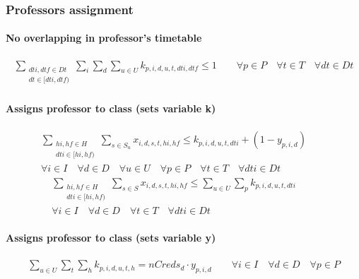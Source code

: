 \subsubsection{Professors assignment}

\paragraph{No overlapping in professor's timetable}
\begin{eqnarray}
\sum_{ \substack {dti,dtf \in Dt \\ dt \in [dti,dtf)} } \sum\limits_{i} \sum\limits_{d} \sum\limits_{u \in U} k_{p,i,d,u,t,dti,dtf} \le 1 \nonumber \qquad
\forall p \in P \quad
\forall t \in T \quad
\forall dt \in Dt
\end{eqnarray}

\paragraph{Assigns professor to class (sets variable k)}
\begin{eqnarray}
\sum_{ \substack {hi,hf \in H \\ dti \in [hi,hf)} } \sum\limits_{s\in S_{u}} x_{i,d,s,t,hi,hf} \le k_{p,i,d,u,t,dti} + ( 1 - y_{p,i,d} ) \nonumber \qquad
\\
\forall i \in I \quad
\forall d \in D \quad
\forall u \in U \quad
\forall p \in P \quad
\forall t \in T \quad
\forall dti \in Dt
\end{eqnarray}
\begin{eqnarray}
\sum_{ \substack {hi,hf \in H \\ dti \in [hi,hf)} } \sum\limits_{s\in S} x_{i,d,s,t,hi,hf} \le \sum\limits_{u\in U} \sum\limits_{p} k_{p,i,d,u,t,dti} \nonumber \qquad
\\
\forall i \in I \quad
\forall d \in D \quad
\forall t \in T \quad
\forall dti \in Dt
\end{eqnarray}
	
\paragraph{Assigns professor to class (sets variable y)}
\begin{eqnarray}
\sum\limits_{u \in U} \sum\limits_{t} \sum\limits_{h} k_{p,i,d,u,t,h} = nCreds_{d} \cdot y_{p,i,d} \nonumber \qquad
\forall i \in I \quad
\forall d \in D \quad
\forall p \in P
\end{eqnarray}	
	

